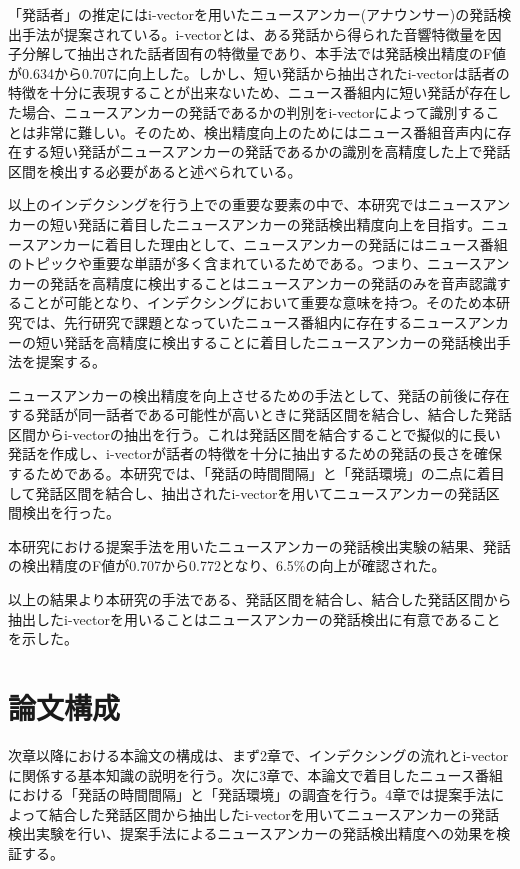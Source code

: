「発話者」の推定にはi-vectorを用いたニュースアンカー(アナウンサー)の発話検出手法\cite{nozaki_gakuseikai}が提案されている。i-vectorとは、ある発話から得られた音響特徴量を因子分解して抽出された話者固有の特徴量であり、本手法では発話検出精度のF値が0.634から0.707に向上した。しかし、短い発話から抽出されたi-vectorは話者の特徴を十分に表現することが出来ないため\cite{panaiv}、ニュース番組内に短い発話が存在した場合、ニュースアンカーの発話であるかの判別をi-vectorによって識別することは非常に難しい。そのため、検出精度向上のためにはニュース番組音声内に存在する短い発話がニュースアンカーの発話であるかの識別を高精度した上で発話区間を検出する必要があると述べられている。\par

以上のインデクシングを行う上での重要な要素の中で、本研究ではニュースアンカーの短い発話に着目したニュースアンカーの発話検出精度向上を目指す。ニュースアンカーに着目した理由として、ニュースアンカーの発話にはニュース番組のトピックや重要な単語が多く含まれているためである。つまり、ニュースアンカーの発話を高精度に検出することはニュースアンカーの発話のみを音声認識することが可能となり、インデクシングにおいて重要な意味を持つ。そのため本研究では、先行研究\cite{nozaki_gakuseikai}で課題となっていたニュース番組内に存在するニュースアンカーの短い発話を高精度に検出することに着目したニュースアンカーの発話検出手法を提案する。\par

ニュースアンカーの検出精度を向上させるための手法として、発話の前後に存在する発話が同一話者である可能性が高いときに発話区間を結合し、結合した発話区間からi-vectorの抽出を行う。これは発話区間を結合することで擬似的に長い発話を作成し、i-vectorが話者の特徴を十分に抽出するための発話の長さを確保するためである。本研究では、「発話の時間間隔」と「発話環境」の二点に着目して発話区間を結合し、抽出されたi-vectorを用いてニュースアンカーの発話区間検出を行った。\par

本研究における提案手法を用いたニュースアンカーの発話検出実験の結果、発話の検出精度のF値が0.707から0.772となり、6.5\%の向上が確認された。\par

以上の結果より本研究の手法である、発話区間を結合し、結合した発話区間から抽出したi-vectorを用いることはニュースアンカーの発話検出に有意であることを示した。

\section{論文構成}
次章以降における本論文の構成は、まず2章で、インデクシングの流れとi-vectorに関係する基本知識の説明を行う。次に3章で、本論文で着目したニュース番組における「発話の時間間隔」と「発話環境」の調査を行う。4章では提案手法によって結合した発話区間から抽出したi-vectorを用いてニュースアンカーの発話検出実験を行い、提案手法によるニュースアンカーの発話検出精度への効果を検証する。


